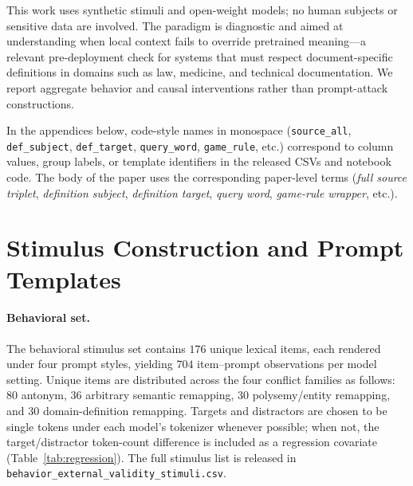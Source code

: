 \documentclass[11pt]{article}
\begin{document}
This work uses synthetic stimuli and open-weight models; no human subjects or sensitive data are
involved. The paradigm is diagnostic and aimed at understanding when local context fails to
override pretrained meaning---a relevant pre-deployment check for systems that must respect
document-specific definitions in domains such as law, medicine, and technical documentation.
We report aggregate behavior and causal interventions rather than prompt-attack constructions.




\appendix

In the appendices below, code-style names in monospace (\texttt{source\_all},
\texttt{def\_subject}, \texttt{def\_target}, \texttt{query\_word}, \texttt{game\_rule}, etc.)
correspond to column values, group labels, or template identifiers in the released CSVs and
notebook code. The body of the paper uses the corresponding paper-level terms (\emph{full source
triplet}, \emph{definition subject}, \emph{definition target}, \emph{query word},
\emph{game-rule wrapper}, etc.).

\section{Stimulus Construction and Prompt Templates}
\label{app:stimuli}

\paragraph{Behavioral set.}
The behavioral stimulus set contains $176$ unique lexical items, each rendered under four prompt
styles, yielding $704$ item--prompt observations per model setting. Unique items are distributed
across the four conflict families as follows: $80$ antonym, $36$ arbitrary semantic remapping,
$30$ polysemy/entity remapping, and $30$ domain-definition remapping. Targets and distractors
are chosen to be single tokens under each model's tokenizer whenever possible; when not, the
target/distractor token-count difference is included as a regression covariate
(Table~\ref{tab:regression}). The full stimulus list is released in
\texttt{behavior\_\allowbreak external\_\allowbreak validity\_\allowbreak stimuli.csv}.
\end{document}
